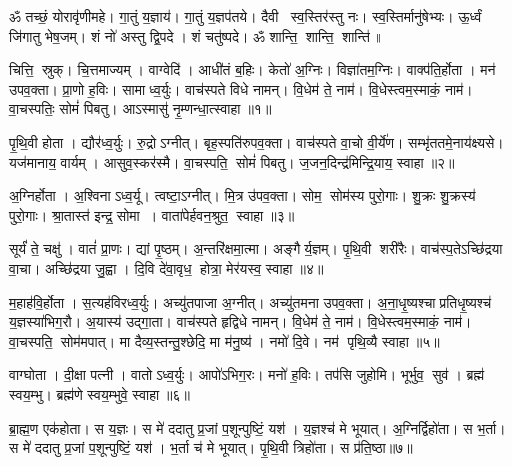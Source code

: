\setcounter{anuvakam}{0}
ॐ तच्छं॒ योरावृ॑णीमहे। गा॒तुं य॒ज्ञाय॑। गा॒तुं य॒ज्ञप॑तये। 
दैवी स्व॒स्तिर॑स्तु नः। स्व॒स्तिर्मानु॑षेभ्यः। ऊ॒र्ध्वं जि॑गातु भेष॒जम्। 
शं नो॑ अस्तु द्वि॒पदे। शं चतु॑ष्पदे। ॐ शान्ति॒ शान्ति॒ शान्ति॑॥

चित्ति॒ स्रुक्। चि॒त्तमाज्यम्। वाग्वेदि॑। आधी॑तं ब॒\ar{}हिः। केतो॑ अ॒ग्निः। विज्ञा॑तम॒ग्निः। वाक्प॑ति॒र्\mbox{}होता। मन॑ उपव॒क्ता। प्रा॒णो ह॒विः। सामाध्व॒र्युः। वाच॑स्पते विधे नामन्। वि॒धेम॑ ते॒ नाम॑। वि॒धेस्त्वम॒स्माकं॒ नाम॑। वा॒चस्पतिः॒ सोमं॑ पिबतु। आऽस्मासु॑ नृ॒म्णन्धा॒त्स्वाहा॥१॥
\anuvakamend[अ॒ध्व॒र्युः पञ्च॑ च]

पृ॒थि॒वी होता। द्यौर॑ध्व॒र्युः। रु॒द्रोऽग्नीत्। बृह॒स्पति॑रुपव॒क्ता। वाच॑स्पते वा॒चो वी॒र्ये॑ण। सम्भृ॑ततमे॒नाय॑क्ष्यसे। यज॑मानाय॒ वार्यम्। आसुव॒स्कर॑स्मै। वा॒चस्पति॒ सोमं॑ पिबतु। ज॒जन॒दिन्द्र॑\-मिन्द्रि॒याय॒ स्वाहा॥२॥%
\anuvakamend[पृ॒थि॒वी होता॒ दश॑]

अ॒ग्निर्\mbox{}होता। अ॒श्विनाऽध्व॒र्यू। त्वष्टा॒ऽग्नीत्। मि॒त्र उ॑पव॒क्ता। सोम॒ सोम॑स्य पुरो॒गाः। शु॒क्रः  शु॒क्रस्य॑ पुरो॒गाः। श्रा॒तास्त॑ इन्द्र॒ सोमा। वाता॑पेर्\mbox{}हवन॒श्रुत॒ स्वाहा॥३॥%
\anuvakamend[अ॒ग्निर्होता॒ऽष्टौ]

सूर्यं॑ ते॒ चक्षु॑। वातं॑ प्रा॒णः। द्यां पृ॒ष्ठम्। अ॒न्तरि॑क्षमा॒त्मा। अङ्गैर्\mbox{}य॒ज्ञम्। पृ॒थि॒वी शरी॑रैः। वाच॑स्प॒तेऽच्छि॑द्रया वा॒चा। अच्छि॑द्रया जु॒ह्वा। दि॒वि दे॑वा॒वृध॒ होत्रा॒ मेर॑यस्व॒ स्वाहा॥४॥
\anuvakamend[सूर्यं॑ ते॒ नव॑]

म॒हाह॑वि॒र्\mbox{}होता। स॒त्यह॑विरध्व॒र्युः। अच्यु॑तपाजा अ॒ग्नीत्। अच्यु॑तमना उपव॒क्ता। अ॒ना॒धृ॒ष्यश्चाप्रतिधृ॒ष्यश्च॑ य॒ज्ञस्या॑भिग॒रौ। अ॒यास्य॑ उद्गा॒ता। वाच॑स्पते हृद्विधे नामन्। वि॒धेम॑ ते॒ नाम॑। वि॒धेस्त्वम॒स्माकं॒ नाम॑। वा॒चस्पति॒ सोम॑मपात्। मा दैव्य॒स्तन्तु॒श्छेदि॒ मा म॑नु॒ष्य॑। नमो॑ दि॒वे। नम॑ पृथि॒व्यै स्वाहा॥५॥%
\anuvakamend[अ॒पा॒त्त्रीणि॑ च]

वाग्घोता। दी॒क्षा पत्नी। वातोऽध्व॒र्युः। आपो॑ऽभिग॒रः। मनो॑ ह॒विः। तप॑सि जुहोमि। भूर्भुव॒ सुव॑। ब्रह्म॑ स्वय॒म्भु। ब्रह्म॑णे स्वय॒म्भुवे॒ स्वाहा॥६॥
\anuvakamend[वाग्घोता॒ नव॑]

ब्रा॒ह्म॒ण एक॑होता। स य॒ज्ञः। स मे॑ ददातु प्र॒जां प॒शून्पुष्टिं॒ यश॑। य॒ज्ञश्च॑ मे भूयात्। अ॒ग्निर्द्विहो॑ता। स भ॒र्ता। स मे॑ ददातु प्र॒जां प॒शून्पुष्टिं॒ यश॑। भ॒र्ता च॑ मे भूयात्। पृ॒थि॒वी त्रिहो॑ता। स प्र॑ति॒ष्ठा॥७॥

